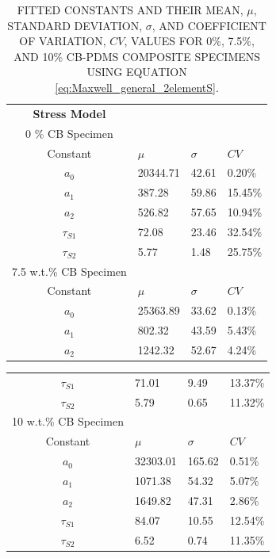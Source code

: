 \begin{table}[h!]
\caption{FITTED CONSTANTS AND THEIR MEAN, $\mu$, STANDARD DEVIATION, $\sigma$, AND COEFFICIENT OF VARIATION, $CV$, VALUES FOR 0\%, 7.5\%, AND 10\% CB-PDMS COMPOSITE SPECIMENS USING EQUATION \ref{eq:Maxwell_general_2elementS}.}
\begin{center}
\label{tab:generalised_model_constants}
\begin{tabular}{c l l l}
\textbf{Stress Model} \\
0 \% CB Specimen \\
Constant & $\mu$ & $\sigma$ & $CV$ \\
\hline
$a_0$ & 20344.71 & 42.61 & 0.20\% \\
$a_1$ & 387.28 & 59.86 & 15.45\% \\
$a_2$ & 526.82 & 57.65 & 10.94\% \\
$\tau_{S1}$ & 72.08 & 23.46 & 32.54\% \\
$\tau_{S2}$ & 5.77 & 1.48 & 25.75\% \\
\hline
7.5 w.t.\% CB Specimen \\
Constant & $\mu$ & $\sigma$ & $CV$ \\
\hline
$a_0$ & 25363.89 & 33.62 & 0.13\% \\
$a_1$ & 802.32 & 43.59 & 5.43\% \\
$a_2$ & 1242.32 & 52.67 & 4.24\% \\
\end{tabular}
\end{center}
\end{table}
\begin{table}[h!]
\begin{center}
\label{tab:generalised_model_constants}
\begin{tabular}{c l l l}
$\tau_{S1}$ & 71.01 & 9.49 & 13.37\% \\
$\tau_{S2}$ & 5.79 & 0.65 & 11.32\% \\
\hline
10 w.t.\% CB Specimen \\
Constant & $\mu$ & $\sigma$ & $CV$ \\
\hline
$a_0$ & 32303.01 & 165.62 & 0.51\% \\
$a_1$ & 1071.38 & 54.32 & 5.07\% \\
$a_2$ & 1649.82 & 47.31 & 2.86\% \\
$\tau_{S1}$ & 84.07 & 10.55 & 12.54\% \\
$\tau_{S2}$ & 6.52 & 0.74 & 11.35\% \\
\hline
\end{tabular}
\end{center}
\end{table}
